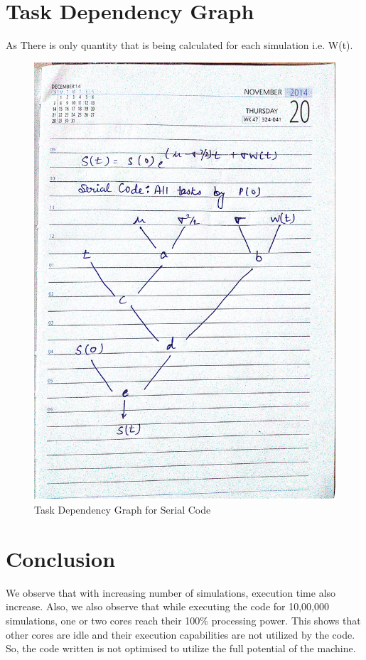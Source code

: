 \documentclass[10pt,a4paper]{article}
\begin{document}
\newpage
\section{Task Dependency Graph}
As There is only quantity that is being calculated for each simulation i.e. W(t).
\begin{figure}[h]
\centering
\includegraphics[scale=0.06]{Task_Dependency_Serial}
\caption{Task Dependency Graph for Serial Code}
\end{figure}


\newpage
\section{Conclusion}
We observe that with increasing number of simulations, execution time also increase. Also, we also observe that while executing the code for 10,00,000 simulations, one or two cores reach their 100\% processing power. This shows that other cores are idle and their execution capabilities are not utilized by the code. So, the code written is not optimised to utilize the full potential of the machine.
\end{document}
